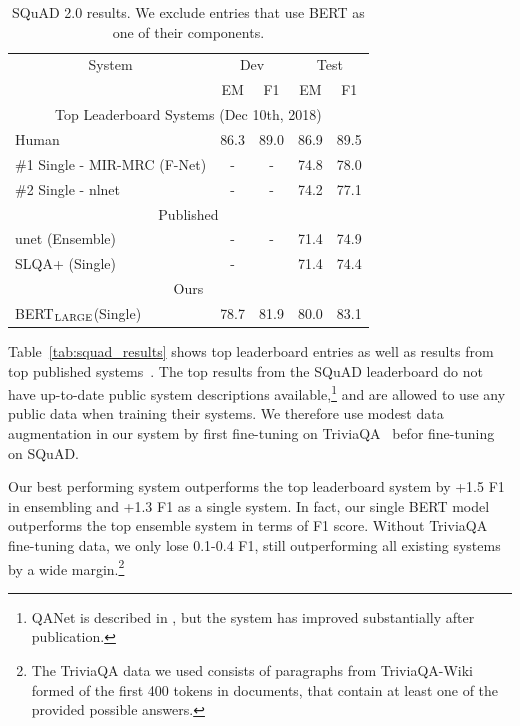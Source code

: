 \documentclass[11pt,a4paper]{article}
\newcommand\bertlarge{BERT$_{\small \textsc{LARGE}}$\xspace}
\begin{document}
\begin{table}[t]
\begin{center}
{\small
\begin{tabular}{@{}lcccc@{}}
  \toprule
  \multicolumn{1}{c}{System} & \multicolumn{2}{c}{Dev} & \multicolumn{2}{c}{Test} \\
  & EM & F1 & EM & F1 \\
  \midrule

\multicolumn{5}{c}{Top Leaderboard Systems (Dec 10th, 2018)} \\
  Human                & 86.3 & 89.0 & 86.9& 89.5 \\ 
  \#1 Single - MIR-MRC (F-Net)   & - & - & 74.8 & 78.0 \\ 
  \#2 Single - nlnet   & - & - & 74.2 & 77.1 \\ 
  \midrule
  \multicolumn{5}{c}{Published}     \\
 unet (Ensemble) & - & -  & 71.4  & 74.9 \\ 
 SLQA+ (Single) & - & & 71.4 & 74.4\\
  \midrule
  \multicolumn{5}{c}{Ours} \\
  \bertlarge (Single)    & 78.7 & 81.9 & 80.0   &  83.1
 \\ 

\bottomrule
\end{tabular}
} 
\end{center}
\caption{\label{tab:squad2_results} SQuAD 2.0 results. We exclude entries that use BERT as one of their components.}
\end{table}

Table~\ref{tab:squad_results} shows top leaderboard entries as well as results from top published systems~\cite{bidaf,clark-gardner:2018:_simpl,peters-etal:2018:_deep,hu2017reinforced}.
The top results from the SQuAD leaderboard do not have up-to-date public system descriptions available,\footnote{QANet is described in , but the system has improved substantially after publication.} and are allowed to use any public data when training their systems. We therefore use modest data augmentation in our system by first fine-tuning on TriviaQA~\cite{joshi-etal:2017:_triviaq} befor fine-tuning on SQuAD.

Our best performing system outperforms the top leaderboard system by +1.5 F1 in ensembling and +1.3 F1 as a single system. In fact, our single BERT model outperforms the top ensemble system in terms of F1 score. Without TriviaQA fine-tuning data, we only lose 0.1-0.4 F1, still outperforming all existing systems by a wide margin.\footnote{The TriviaQA data we used consists of paragraphs from TriviaQA-Wiki formed of the first 400 tokens in documents, that contain at least one of the provided possible answers.}
\end{document}
